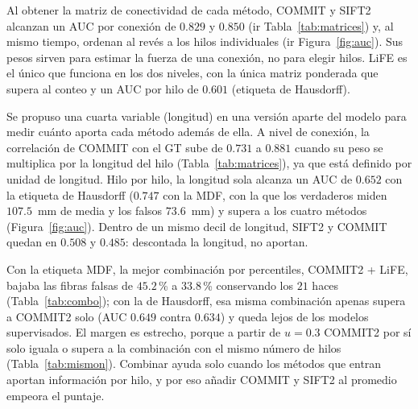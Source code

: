 \documentclass[11pt,a4paper]{article}
\begin{document}
Al obtener la matriz de conectividad de cada método, COMMIT y SIFT2 alcanzan un AUC por conexi\'on de $0.829$ y $0.850$ (ir Tabla~\ref{tab:matrices}) y, al mismo tiempo, ordenan al rev\'es a los hilos individuales (ir Figura~\ref{fig:auc}). Sus pesos sirven para estimar la fuerza de una conexi\'on, no para elegir hilos. LiFE es el \'unico que funciona en los dos niveles, con la \'unica matriz ponderada que supera al conteo y un AUC por hilo de $0.601$ (etiqueta de Hausdorff).


Se propuso una cuarta variable (longitud) en una versión aparte del modelo para medir cu\'anto aporta cada m\'etodo adem\'as de ella. A nivel de conexi\'on, la correlaci\'on de COMMIT con el GT sube de $0.731$ a $0.881$ cuando su peso se multiplica por la longitud del hilo (Tabla~\ref{tab:matrices}), ya que est\'a definido por unidad de longitud. Hilo por hilo, la longitud sola alcanza un AUC de $0.652$ con la etiqueta de Hausdorff ($0.747$ con la MDF, con la que los verdaderos miden $107.5$~mm de media y los falsos $73.6$~mm) y supera a los cuatro m\'etodos (Figura~\ref{fig:auc}). Dentro de un mismo decil de longitud, SIFT2 y COMMIT quedan en $0.508$ y $0.485$: descontada la longitud, no aportan.


Con la etiqueta MDF, la mejor combinaci\'on por percentiles, COMMIT2 + LiFE, bajaba las fibras falsas de $45.2$\,\% a $33.8$\,\% conservando los $21$ haces (Tabla~\ref{tab:combo}); con la de Hausdorff, esa misma combinaci\'on apenas supera a COMMIT2 solo (AUC $0.649$ contra $0.634$) y queda lejos de los modelos supervisados. El margen es estrecho, porque a partir de $u=0.3$ COMMIT2 por s\'i solo iguala o supera a la combinaci\'on con el mismo n\'umero de hilos (Tabla~\ref{tab:mismon}). Combinar ayuda solo
cuando los m\'etodos que entran aportan informaci\'on por hilo, y por eso a\~nadir COMMIT y SIFT2 al promedio empeora el puntaje.
\end{document}
